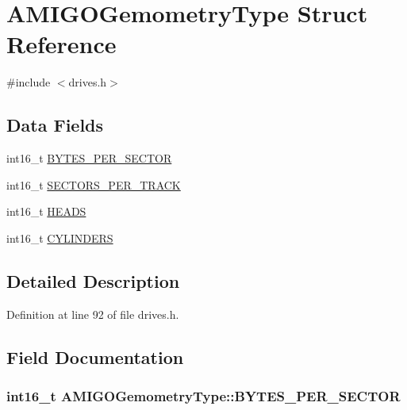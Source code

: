 \hypertarget{structAMIGOGemometryType}{}\section{A\+M\+I\+G\+O\+Gemometry\+Type Struct Reference}
\label{structAMIGOGemometryType}


{\ttfamily \#include $<$drives.\+h$>$}

\subsection*{Data Fields}
\begin{DoxyCompactItemize}
\item 
int16\+\_\+t \hyperlink{structAMIGOGemometryType_a38dc0b559f00c78f30fe0c43c53b582a}{B\+Y\+T\+E\+S\+\_\+\+P\+E\+R\+\_\+\+S\+E\+C\+T\+OR}
\item 
int16\+\_\+t \hyperlink{structAMIGOGemometryType_a9ac647c76bd331ab5b1fd22a4f5b9a4a}{S\+E\+C\+T\+O\+R\+S\+\_\+\+P\+E\+R\+\_\+\+T\+R\+A\+CK}
\item 
int16\+\_\+t \hyperlink{structAMIGOGemometryType_a33131d3948935e2064af9af151653033}{H\+E\+A\+DS}
\item 
int16\+\_\+t \hyperlink{structAMIGOGemometryType_a4282aeb6c4aac3b8cfc09e29402dcd3f}{C\+Y\+L\+I\+N\+D\+E\+RS}
\end{DoxyCompactItemize}


\subsection{Detailed Description}


Definition at line 92 of file drives.\+h.



\subsection{Field Documentation}
\subsubsection[{\texorpdfstring{B\+Y\+T\+E\+S\+\_\+\+P\+E\+R\+\_\+\+S\+E\+C\+T\+OR}{BYTES_PER_SECTOR}}]{\setlength{\rightskip}{0pt plus 5cm}int16\+\_\+t A\+M\+I\+G\+O\+Gemometry\+Type\+::\+B\+Y\+T\+E\+S\+\_\+\+P\+E\+R\+\_\+\+S\+E\+C\+T\+OR}\hypertarget{structAMIGOGemometryType_a38dc0b559f00c78f30fe0c43c53b582a}{}\label{structAMIGOGemometryType_a38dc0b559f00c78f30fe0c43c53b582a}


